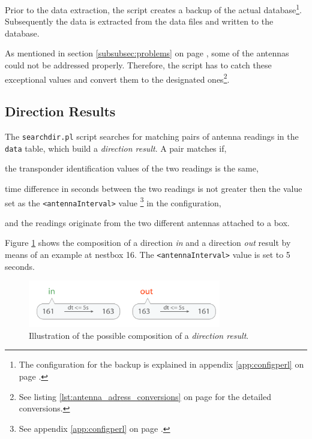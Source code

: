 Prior to the data extraction, the  script creates a backup of the actual database\footnote{The configuration for the backup is explained in appendix \ref{app:configperl} on page \pageref{app:configperl}.}. Subsequently the data is extracted from the data files and written to the database. 

As mentioned in section \ref{subsubsec:problems} on page \pageref{subsubsec:problems}, some of the antennas could not be addressed properly. Therefore, the script has to catch these exceptional values and convert them to the designated ones\footnote{See listing \ref{lst:antenna_adress_conversions} on page \pageref{lst:antenna_adress_conversions} for the detailed conversions.}.  

\subsection{Direction Results}
\label{subsec:dirres}

The \lstinline|searchdir.pl| script searches for matching pairs of antenna readings in the \lstinline|data| table, which build a \textit{direction result}. A pair matches if,

\begin{mylist}
\item the transponder identification values of the two readings is the same,
\item time difference in seconds between the two readings is not greater then the value set as the \lstinline|<antennaInterval>| value \footnote{See appendix \ref{app:configperl} on page \pageref{app:configperl}.} in the configuration, 
\item and the readings originate from the two different antennas attached to a box.  
\end{mylist}

Figure \ref{fig:direction_result} shows the composition of a direction \textit{in} and a direction \textit{out} result by means of an example at nestbox 16. The \lstinline|<antennaInterval>| value is set to 5 seconds.  

\begin{figure}[htpb]
\begin{center}
  \includegraphics[width=0.75\textwidth]{assets/pdf/direction_result_schema.pdf}
  \caption[Illustration of direction result]{Illustration of the possible composition of a \textit{direction result}.}
  \label{fig:direction_result}
\end{center}
\end{figure}

